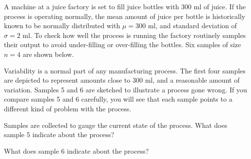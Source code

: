 \documentclass{ximera}
\begin{document}
\begin{exploration}\label{exp:OJ}
  A machine at a juice factory is set to fill juice bottles with 300 ml of juice.  If the process is operating normally, the mean amount of juice per bottle is historically known to be normally distributed with $\mu=300$ ml, and standard deviation of $\sigma=2$ ml. To check how well the process is running the factory routinely samples their output to avoid under-filling or over-filling the bottles.  Six samples of size $n=4$ are shown below.

\begin{center}
      \end{center}

Variability is a normal part of any manufacturing process.  The first four samples are depicted to represent amounts close to 300 ml, and a reasonable amount of variation.  Samples 5 and 6 are sketched to illustrate a process gone wrong.  If you compare samples 5 and 6 carefully, you will see that each sample points to a different kind of problem with the process.

Samples are collected to gauge the current state of the process.  What does sample 5 indicate about the process?

\begin{multipleChoice}
\end{multipleChoice}

What does sample 6 indicate about the process?

\begin{multipleChoice}
\end{multipleChoice}
 
\end{exploration}
\end{document}
